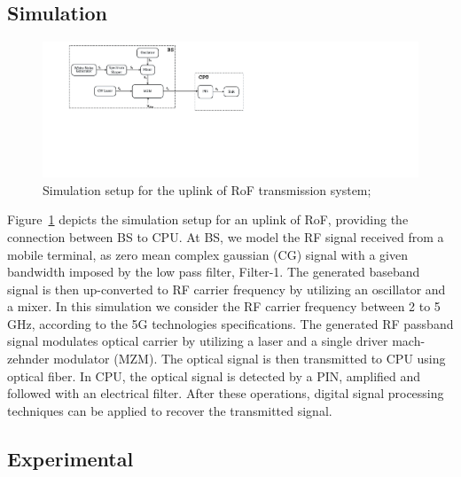 \subsection{Simulation}
\begin{figure}[h!]
    \centering
    \includegraphics[width=\linewidth]{./sdf/radio_over_fiber/figures/block_diagram_flow_simp.pdf}
    \caption{Simulation setup for the uplink of RoF transmission system; }
    \label{fig_RoFdiagram}
\end{figure}

 Figure~\ref{fig_RoFdiagram} depicts the simulation setup for an uplink of RoF, providing the connection between BS to CPU. At BS, we model the RF signal received from a mobile terminal, as zero mean complex gaussian (CG) signal with a given bandwidth imposed by the low pass filter, Filter-1. The generated baseband signal is then up-converted to RF carrier frequency by utilizing an oscillator and a mixer. In this simulation we consider the RF carrier frequency between 2 to 5 GHz, according to the 5G technologies specifications. The generated RF passband signal modulates optical carrier by utilizing a laser and a single driver mach-zehnder modulator (MZM). The optical signal is then transmitted to CPU using optical fiber. In CPU, the optical signal is detected by a PIN, amplified and followed with an electrical filter. After these operations, digital signal processing techniques can be applied to recover the transmitted signal.




\subsection{Experimental}
